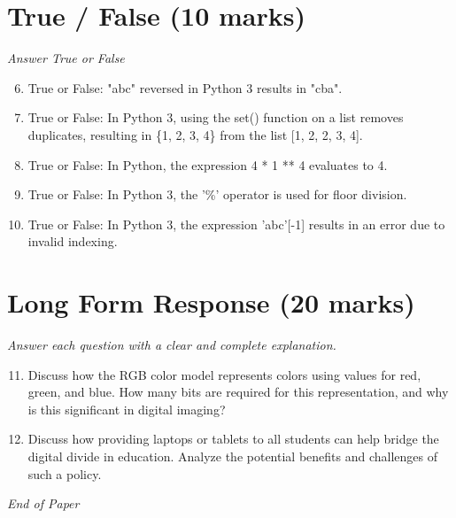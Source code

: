 \documentclass[12pt]{article}
\begin{document}
\section*{True / False (10 marks)}
\textit{Answer True or False}
\begin{enumerate}[label=\arabic*.]
\setcounter{enumi}{5}
\item True or False: "abc" reversed in Python 3 results in "cba".
\item True or False: In Python 3, using the set() function on a list removes duplicates, resulting in \{1, 2, 3, 4\} from the list [1, 2, 2, 3, 4].
\item True or False: In Python, the expression 4 * 1 ** 4 evaluates to 4.
\item True or False: In Python 3, the '\%' operator is used for floor division.
\item True or False: In Python 3, the expression 'abc'[-1] results in an error due to invalid indexing.
\end{enumerate}

\section*{Long Form Response (20 marks)}
\textit{Answer each question with a clear and complete explanation.}
\begin{enumerate}[label=\arabic*.]
\setcounter{enumi}{10}
\item Discuss how the RGB color model represents colors using values for red, green, and blue. How many bits are required for this representation, and why is this significant in digital imaging?
\item Discuss how providing laptops or tablets to all students can help bridge the digital divide in education. Analyze the potential benefits and challenges of such a policy.
\end{enumerate}

\vfill
\noindent\textit{End of Paper}
\end{document}
